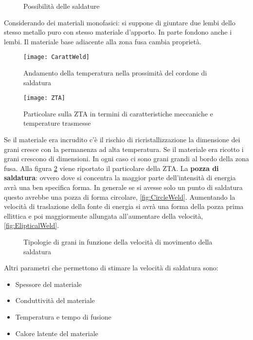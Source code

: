 \begin{figure}
\centering
{}\quad
{}
\caption{Possibilità delle saldature}
\label{fig:Weld}
\end{figure}

Considerando dei materiali monofasici: si suppone di giuntare due lembi dello stesso metallo puro con stesso materiale d'apporto.
In parte fondono anche i lembi.
Il materiale base adiacente alla zona fusa cambia proprietà.

\begin{figure}
\centering
\texttt{[image: CarattWeld]}
\caption{Andamento della temperatura nella prossimità del cordone di saldatura}
\label{fig:CarattWeld}
\texttt{[image: ZTA]}
\caption{Particolare sulla \ac{ZTA} in termini di caratteristiche meccaniche e temperature trasmesse}
\label{fig:ZTA}
\end{figure}

Se il materiale era incrudito c'è il rischio di ricristallizzazione la dimensione dei grani cresce con la permanenza ad alta temperatura.
Se il materiale era ricotto i grani crescono di dimensioni.
In ogni caso ci sono grani grandi al bordo della zona fusa.
Alla figura \ref{fig:ZTA} viene riportato il particolare della \ac{ZTA}.
La \textbf{pozza di saldatura}: ovvero dove si concentra la maggior parte dell'intensità di energia avrà una ben specifica forma.
In generale se si avesse solo un punto di saldatura questo avrebbe una pozza di forma circolare, \ref{fig:CircleWeld}.
Aumentando la velocità di traslazione della fonte di energia si avrà una forma della pozza prima ellittica e poi maggiormente allungata all'aumentare della velocità, \ref{fig:ElipticalWeld}.

\begin{figure}
\centering
{}\quad
{}
\caption{Tipologie di grani in funzione della velocità di movimento della saldatura}
\label{fig:VelWeld}
\end{figure}

Altri parametri che permettono di stimare la velocità di saldatura sono:
\begin{itemize}
\item Spessore del materiale
\item Conduttività del materiale
\item Temperatura e tempo di fusione
\item Calore latente del materiale
\end{itemize}

